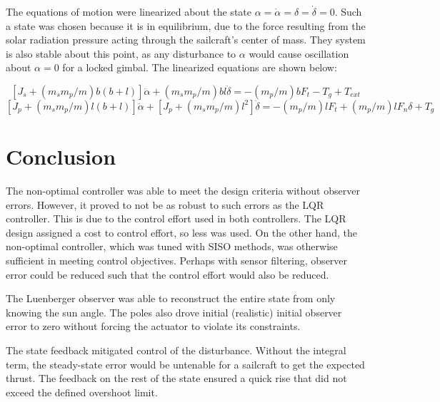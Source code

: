 \documentclass[]{aiaa-tc}%
\begin{document}
	The equations of motion were linearized about the state $\alpha = \dot{\alpha} = \delta = \dot{\delta} =0$. Such a state was chosen because it is in equilibrium, due to the force resulting from the solar radiation pressure acting through the sailcraft's center of mass. They system is also stable about this point, as any disturbance to $\alpha$ would cause oscillation about $\alpha=0$ for a locked gimbal. The linearized equations are shown below\cite{WieSolarSail2}:

\begin{equation} \label{eq:1}
[J_s+(m_sm_p/m)b(b+l)]\ddot{\alpha}+(m_sm_p/m)bl\ddot{\delta}=-(m_p/m)bF_t-T_g+T_{ext}
\end{equation}
\begin{equation} \label{eq:2}
[J_p+(m_sm_p/m)l(b+l)]\ddot{\alpha}+[J_p+(m_sm_p/m)l^2]\ddot{\delta}=-(m_p/m)lF_t+(m_p/m)lF_n\delta+T_g
\end{equation}
	
	\vspace{5 mm}



	\section{Conclusion}

	The non-optimal controller was able to meet the design criteria without observer errors. However, it proved to not be as robust to such errors as the LQR controller. This is due to the control effort used in both controllers. The LQR design assigned a cost to control effort, so less was used. On the other hand, the non-optimal controller, which was tuned with SISO methods, was otherwise sufficient in meeting control objectives. Perhaps with sensor filtering, observer error could be reduced such that the control effort would also be reduced. 

	\vspace{5 mm}

	The Luenberger observer was able to reconstruct the entire state from only knowing the sun angle. The poles also drove initial (realistic) initial observer error to zero without forcing the actuator to violate its constraints.

	\vspace{5 mm}

	The state feedback mitigated control of the disturbance. Without the integral term, the steady-state error would be untenable for a sailcraft to get the expected thrust.  The feedback on the rest of the state ensured a quick rise that did not exceed the defined overshoot limit.
\end{document}
